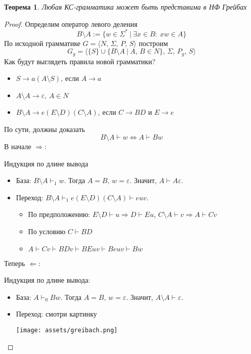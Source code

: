 \documentclass[a4paper,12pt]{article}
\theoremstyle{plain}
\newtheorem{theorem}{Теорема}[subsection]
\theoremstyle{definition}
\theoremstyle{remark}
\begin{document}
\begin{theorem}
	Любая КС-грамматика может быть представима в НФ Грейбах
\end{theorem}

\begin{proof}
	Определим оператор левого деления
	\[
		B \setminus A := \{w \in \Sigma^* \:\vert\: \exists x \in B :\: xw \in A\}
	\]
	По исходной грамматике $G = \langle N,\, \Sigma,\, P,\, S\rangle$ построим
	\[
		G_g = \langle\{S\} \cup \{B \setminus A \:\vert\: A,\, B \in N\},\, \Sigma,\, P_g,\, S\rangle
	\]
	Как будут выглядеть правила новой грамматики?
	\begin{itemize}
		\item $S \to a(A \setminus S)$, если $A \to a$
		\item $A \setminus A \to \varepsilon,\, A \in N$
		\item $B \setminus A \to e(E \setminus D)(C \setminus A)$, если $C \to BD$ и $E \to e$
	\end{itemize}
	По сути, должны доказать
	\[
		B \setminus A \vdash w \Leftrightarrow A \vdash Bw
	\]
	В начале $\Rightarrow$:

	Индукция по длине вывода
	\begin{itemize}
		\item База: $B \setminus A \vdash_1 w$. Тогда $A = B,\, w = \varepsilon$. Значит, $A \vdash A\varepsilon$.
		\item Переход: $B \setminus A \vdash_1 e(E \setminus D)(C \setminus A) \vdash euv$.
		      \begin{itemize}
			      \item По предположению: $E \setminus D \vdash u \Rightarrow D \vdash Eu$, $C \setminus A \vdash v \Rightarrow A \vdash Cv$
			      \item По условию $C \vdash BD$
			      \item $A \vdash Cv \vdash BDv \vdash BEuv \vdash Beuv \vdash Bw$
		      \end{itemize}
	\end{itemize}
	Теперь $\Leftarrow$:

	Индукция по длине вывода:
	\begin{itemize}
		\item База: $A \vdash_0 Bw$. Тогда $A = B,\, w = \varepsilon$. Значит, $A \setminus A \vdash \varepsilon$.
		\item Переход: смотри картинку

		      \texttt{[image: assets/greibach.png]}
	\end{itemize}


\end{proof}
\end{document}
